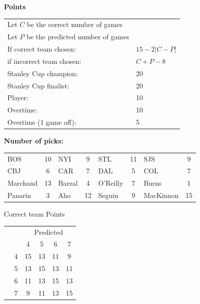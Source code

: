 \documentclass[10pt]{article}
\newcommand{\mccn}[2]{\multicolumn{#1}{c}{#2}}
\begin{document}
{\bf Points}\\
\begin{minipage}[t]{10cm}
    \vspace{0pt}
    \begin{tabular}{l l}
        Let $C$ be the correct number of games\\
        Let $P$ be the predicted number of games\\
        If correct team chosen:	   & $15 - 2 \left|{C - P}\right|$\\
        if incorrect team chosen:  & $C + P - 8$\\
        Stanley Cup champion:	& 20\\
        Stanley Cup finalist:	& 20\\
        Player:                 & 10\\
        Overtime:               & 10\\
        Overtime (1 game off):  & 5\\
    \end{tabular}

    \vspace{0.5cm}
    {\bf Number of picks:}\\
    \begin{tabular}{lc | lc | lc | lc }
        BOS & 10 & NYI & 9 & STL & 11 & SJS & 9 \\
        CBJ & 6 & CAR & 7 & DAL & 5 & COL & 7 \\
        Marchand & 13 & Barzal & 4 & O'Reilly & 7 & Burns & 1 \\
        Panarin & 3 & Aho & 12 & Seguin & 9 & MacKinnon & 15 \\
    \end{tabular}
\end{minipage}
%
\begin{minipage}[t]{4cm}
    \vspace{0pt}
    \qquad Correct team Points\\
    \begin{tabular}{c l | c c c c }
        \mccn{2}{} & \mccn{4}{Predicted}\\
        & & 4 & 5 & 6 & 7\\\cline{2-6}
        \parbox[t]{2mm}{} & 4 & 15 & 13 & 11 & 9\\
        & 5 & 13 & 15 & 13 & 11\\
        & 6 & 11 & 13 & 15 & 13\\
        & 7 & 9 & 11 & 13 & 15
    \end{tabular}
\end{minipage}
\end{document}
